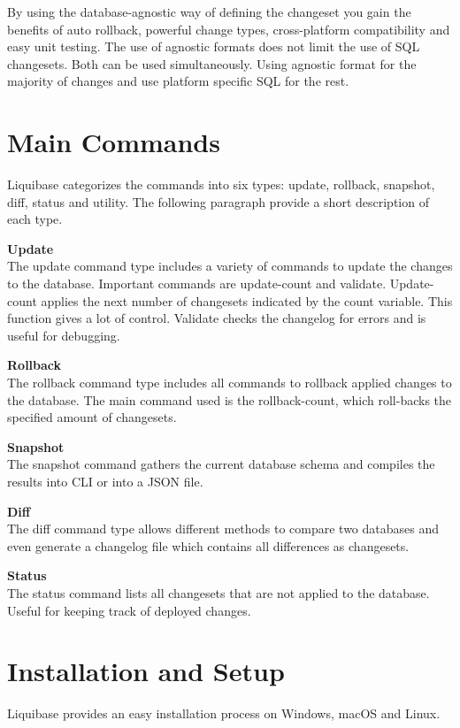 By using the database-agnostic way of defining the changeset you gain the benefits of auto rollback, powerful change types, cross-platform compatibility and easy unit testing. The use of agnostic formats does not limit the use of \gls{SQL} changesets. Both can be used simultaneously. Using agnostic format for the majority of changes and use platform specific \gls{SQL} for the rest.


\section{Main Commands \cite{Liquibase}}
Liquibase categorizes the commands into six types: update, rollback, snapshot, diff, status and utility. The following paragraph provide a short description of each type.

\textbf{Update}\\
%
The update command type includes a variety of commands to update the changes to the database. Important commands are update-count and validate. Update-count applies the next number of changesets indicated by the count variable. This function gives a lot of control. Validate checks the changelog for errors and is useful for debugging.

\textbf{Rollback}\\
%
The rollback command type includes all commands to rollback applied changes to the database. The main command used is the rollback-count, which roll-backs the specified amount of changesets.

\textbf{Snapshot}\\
%
The snapshot command gathers the current database schema and compiles the results into \gls{CLI} or into a JSON file.

\textbf{Diff}\\
%
The diff command type allows different methods to compare two databases and even generate a changelog file which contains all differences as changesets.

\textbf{Status}\\
%
The status command lists all changesets that are not applied to the database. Useful for keeping track of deployed changes.


\section{Installation and Setup}
%
Liquibase provides an easy installation process on Windows, macOS and Linux.

